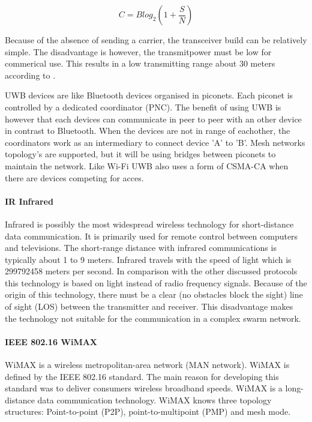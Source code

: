 \documentclass[10pt,a4paper]{article}
\begin{document}
 \begin{equation}
    C=Blog_2(1+\frac{S}{N})
    \label{eq:channelcapacity}
 \end{equation}

 Because of the absence of sending a carrier, the transceiver build can be relatively simple. \cite{ultrawidebandwirelesscommunications} The disadvantage is however, the transmitpower must be low for commerical use. This results in a low transmitting range about 30 meters according to \cite{combook}.

UWB devices are like Bluetooth devices organised in piconets. Each piconet is controlled by a dedicated coordinator (PNC). The benefit of using UWB is however that each devices can communicate in peer to peer with an other device in contrast to Bluetooth. When the devices are not in range of eachother, the coordinators work as an intermediary to connect device 'A' to 'B'. Mesh networks topology's are supported, but it will be using bridges between piconets to maintain the network. Like Wi-Fi UWB also uses a form of CSMA-CA when there are devices competing for acces. \cite{piconetinterconnectionstrategies}

\paragraph{IR Infrared}
Infrared is possibly the most widespread wireless technology for short-distance data communication. \cite{combook} It is primarily used for remote control between computers and televisions. The short-range distance with infrared communications is typically about 1 to 9 meters. \cite{combook} Infrared travels with the speed of light which is 299792458 meters per second. \cite{speedoflight} In comparison with the other discussed protocols this technology is based on light instead of radio frequency signals. Because of the origin of this technology, there must be a clear (no obstacles block the sight) line of sight (LOS) between the transmitter and receiver. This disadvantage makes the technology not suitable for the communication in a complex swarm network.\\

\paragraph{IEEE 802.16 WiMAX}
WiMAX is a wireless metropolitan-area network (MAN network). WiMAX is defined by the IEEE 802.16 standard. The main reason for developing this standard was to deliver consumers wireless broadband speeds. WiMAX is a long-distance data communication technology. WiMAX knows three topology structures: Point-to-point (P2P), point-to-multipoint (PMP) and mesh mode.\\
\end{document}
